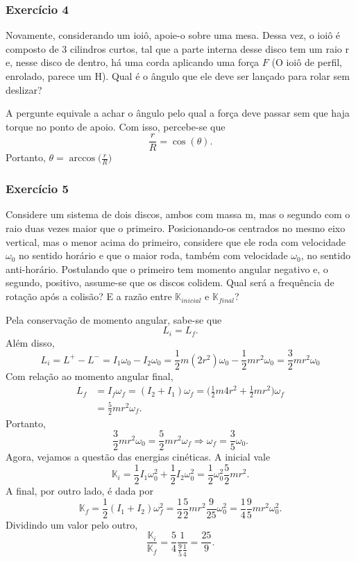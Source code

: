 \documentclass{article}
\begin{document}
\subsubsection{Exercício 4}
  Novamente, considerando um ioiô, apoie-o sobre uma mesa. Dessa vez, o ioiô é composto de 3 cilindros curtos, tal que a parte interna desse disco tem um raio r e,
nesse disco de dentro, há uma corda aplicando uma força \(F\) (O ioiô de perfil, enrolado, parece um H). Qual é o ângulo que ele deve ser lançado para rolar
sem deslizar?

  A pergunte equivale a achar o ângulo pelo qual a força deve passar sem que haja torque no ponto de apoio. Com isso, percebe-se que 
    \[
      \frac{r}{R} = \cos{(\theta )}.
    \]
    Portanto, \(\theta = \arccos{\biggl(\frac{r}{R}\biggr)}\)
\subsubsection{Exercício 5}
  Considere um sistema de dois discos, ambos com massa m, mas o segundo com o raio duas vezes maior que o primeiro. Posicionando-os centrados no mesmo eixo vertical, mas
o menor acima do primeiro, considere que ele roda com velocidade \(\omega_{0}\) no sentido horário e que o maior roda, também com velocidade \(\omega_{0}\), no sentido anti-horário. 
Postulando que o primeiro tem momento angular negativo e, o segundo, positivo, assume-se que os discos colidem. Qual será a frequência de rotação após a colisão?
E a razão entre \(\mathbb{K}_{inicial}\) e \(\mathbb{K}_{final}\)?

  Pela conservação de momento angular, sabe-se que 
    \[
      L_{i} = L_{f}.
    \]
  Além disso, 
  \[
  L_{i} = L^{+}-L^{-} = I_{1}\omega_{0} - I_{2}\omega_{0} = \frac{1}{2}m(2r^{2})\omega_{0} - \frac{1}{2}mr^{2}\omega_{0} = \frac{3}{2}mr^{2}\omega_{0}
  \]
  Com relação ao momento angular final, 
 \begin{align*}
   L_{f} &= I_{f}\omega_{f} = (I_{2} + I_{1})\omega_{f} = \biggl(\frac{1}{2}m4r^{2}+\frac{1}{2}mr^{2}\biggr)\omega_{f}\\
         &=\frac{5}{2}mr^{2}\omega_{f}.
 \end{align*}
 Portanto, 
   \[
     \frac{3}{2}mr^{2}\omega_{0} = \frac{5}{2}mr^{2}\omega_{f} \Rightarrow \omega_{f}=\frac{3}{5}\omega_{0}.
   \]
  Agora, vejamos a questão das energias cinéticas. A inicial vale 
    \[
      \mathbb{K}_{i} = \frac{1}{2}I_{1}\omega_{0}^{2} + \frac{1}{2}I_{2}\omega_{0}^{2} = \frac{1}{2}\omega_{0}^{2}\frac{5}{2}mr^{2}. 
    \]
  A final, por outro lado, é dada por 
    \[
      \mathbb{K}_{f} = \frac{1}{2}(I_{1}+I_{2})\omega_{f}^{2} = \frac{1}{2}\frac{5}{2}mr^{2}\frac{9}{25}\omega_{0}^{2} = \frac{1}{4}\frac{9}{5}mr^{2}\omega_{0}^{2}.
    \]
  Dividindo um valor pelo outro, 
    \[
      \frac{\mathbb{K}_{i}}{\mathbb{K}_{f}} = \frac{5}{4}\frac{1}{\frac{9}{5}\frac{1}{4}} = \frac{25}{9}.
    \]
\newpage
\end{document}

